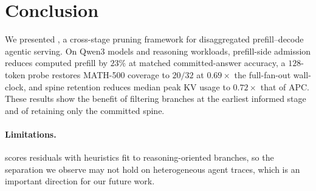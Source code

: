\section{Conclusion}
\label{sec:conclusion}

We presented \sys, a cross-stage pruning framework for disaggregated prefill--decode agentic serving.
On Qwen3 models and reasoning workloads, prefill-side admission reduces computed prefill by $23\%$ at matched committed-answer accuracy, a $128$-token probe restores MATH-500 coverage to $20/32$ at $0.69\times$ the full-fan-out wall-clock, and spine retention reduces median peak KV usage to $0.72\times$ that of APC.
These results show the benefit of filtering branches at the earliest informed stage and of retaining only the committed spine.

\paragraph{Limitations.}
\label{sec:limitations}
\sys scores residuals with heuristics fit to reasoning-oriented branches, so the separation we observe may not hold on heterogeneous agent traces, which is an important direction for our future work.